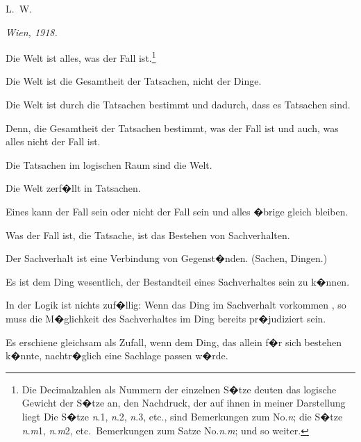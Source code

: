 \begin{minipage}{0.9\textwidth}
\vspace{3.5ex}
\begin{flushright}
L.~W.
\end{flushright}

\textit{\footnotesize Wien, 1918.}
\end{minipage}



\begin{propositions}
{Die Welt ist alles, was der Fall ist.\footnote{Die Decimalzahlen als Nummern der einzelnen S�tze deuten das logische
Gewicht der S�tze an, den Nachdruck, der auf ihnen in meiner Darstellung liegt
Die S�tze \textit{n}.1, \textit{n}.2, \textit{n}.3, etc., sind Bemerkungen zum  No.\;\textit{n}; die S�tze \textit{n}.\textit{m}1,
\textit{n}.\textit{m}2, etc.\ Bemerkungen zum Satze No.\;\textit{n}.\textit{m}; und so weiter.}}


{Die Welt ist die Gesamtheit der Tatsachen,
nicht der Dinge.}


{Die Welt ist durch die Tatsachen bestimmt und
dadurch, dass es  Tatsachen sind.}


{Denn, die Gesamtheit der Tatsachen bestimmt,
was der Fall ist und auch, was alles nicht der Fall ist.}


{Die Tatsachen im logischen Raum sind die Welt.}


{Die Welt zerf�llt in Tatsachen.}


{Eines kann der Fall sein oder nicht der Fall sein
und alles �brige gleich bleiben.}


{Was der Fall ist, die Tatsache, ist das Bestehen
von Sachverhalten.}


{Der Sachverhalt ist eine Verbindung von
Gegenst�nden. (Sachen, Dingen.)}


{Es ist dem Ding wesentlich, der Bestandteil
eines Sachverhaltes sein zu k�nnen.}


{In der Logik ist nichts zuf�llig: Wenn das Ding
im Sachverhalt vorkommen , so muss die
M�glichkeit des Sachverhaltes im Ding bereits
pr�judiziert sein.}


{Es erschiene gleichsam als Zufall, wenn dem
Ding, das allein f�r sich bestehen k�nnte, nachtr�glich
eine Sachlage passen w�rde.

}
\end{propositions}

